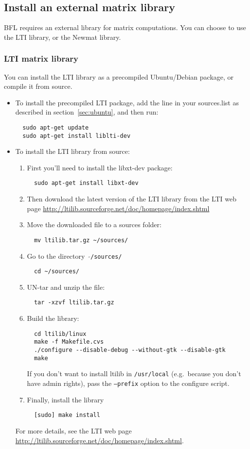 \documentclass[a4paper,10pt]{article}
\begin{document}
\subsection{Install an external matrix library}
BFL requires an external library for matrix computations. You can
choose to use the LTI library, or the Newmat library.

\subsubsection{LTI matrix library}
\label{subsec:lti}
You can install the LTI library as a precompiled Ubuntu/Debian
package, or compile it from source. 
\begin{itemize}
\item To install the precompiled LTI package, add the line in your
  sources.list as described in section~\ref{sec:ubuntu}, and then run:
\begin{verbatim}
  sudo apt-get update
  sudo apt-get install liblti-dev
\end{verbatim}
\item To install the LTI library from source:

\begin{enumerate}
\item First you'll need to install the libxt-dev package:
\begin{verbatim}
  sudo apt-get install libxt-dev
\end{verbatim}
\item Then download the latest version of the LTI library from the LTI
  web page
  \url{http://ltilib.sourceforge.net/doc/homepage/index.shtml}
\item Move the downloaded file to a sources folder:
\begin{verbatim}
  mv ltilib.tar.gz ~/sources/
\end{verbatim}
\item Go to the directory \ $\mathtt{\tilde{ }}$\texttt{/sources/}
\begin{verbatim}
  cd ~/sources/
\end{verbatim}
\item UN-tar and unzip the file:
\begin{verbatim}
  tar -xzvf ltilib.tar.gz
\end{verbatim}
\item Build the library:
\begin{verbatim}
  cd ltilib/linux
  make -f Makefile.cvs
  ./configure --disable-debug --without-gtk --disable-gtk
  make
\end{verbatim}
  If you don't want to install ltilib in \texttt{/usr/local}
  (e.g.~because you don't have admin rights), pass the
  \texttt{--prefix} option to the configure script.
\item Finally, install the library
\begin{verbatim}
  [sudo] make install
\end{verbatim}
\end{enumerate}
For more details, see the LTI web page
\url{http://ltilib.sourceforge.net/doc/homepage/index.shtml}.
\end{itemize}
\end{document}
